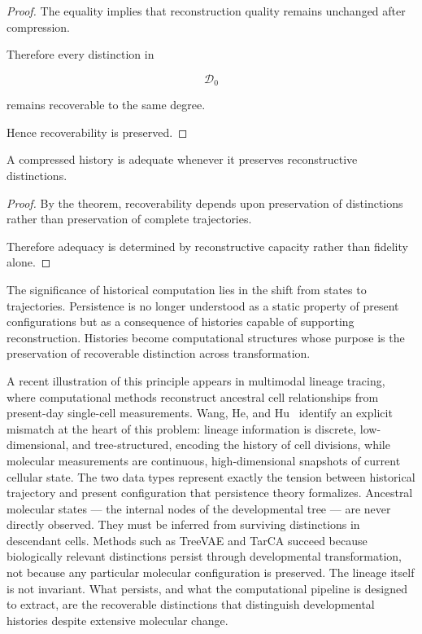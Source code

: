 \documentclass[12pt,oneside]{article}
\theoremstyle{definition}
\begin{document}
\begin{proof}

The equality implies that reconstruction quality remains unchanged after compression.

Therefore every distinction in

\[
\mathcal D_0
\]

remains recoverable to the same degree.

Hence recoverability is preserved.

\end{proof}

\begin{corollary}

A compressed history is adequate whenever it preserves reconstructive distinctions.

\end{corollary}

\begin{proof}

By the theorem, recoverability depends upon preservation of distinctions rather than preservation of complete trajectories.

Therefore adequacy is determined by reconstructive capacity rather than fidelity alone.

\end{proof}

The significance of historical computation lies in the shift from states to trajectories. Persistence is no longer understood as a static property of present configurations but as a consequence of histories capable of supporting reconstruction. Histories become computational structures whose purpose is the preservation of recoverable distinction across transformation.

A recent illustration of this principle appears in multimodal lineage tracing, where computational methods reconstruct ancestral cell relationships from present-day single-cell measurements. Wang, He, and Hu~\cite{wang2026lineage} identify an explicit mismatch at the heart of this problem: lineage information is discrete, low-dimensional, and tree-structured, encoding the history of cell divisions, while molecular measurements are continuous, high-dimensional snapshots of current cellular state. The two data types represent exactly the tension between historical trajectory and present configuration that persistence theory formalizes. Ancestral molecular states --- the internal nodes of the developmental tree --- are never directly observed. They must be inferred from surviving distinctions in descendant cells. Methods such as TreeVAE and TarCA succeed because biologically relevant distinctions persist through developmental transformation, not because any particular molecular configuration is preserved. The lineage itself is not invariant. What persists, and what the computational pipeline is designed to extract, are the recoverable distinctions that distinguish developmental histories despite extensive molecular change.
\end{document}
